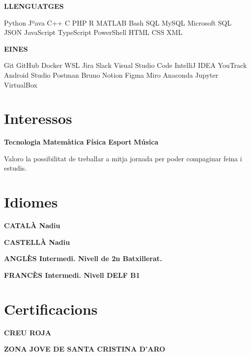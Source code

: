 \documentclass[11pt,a4paper]{article}
\newcommand{\runsubsection}[1]{\color{subheadings}\fontsize{12pt}{12pt}\selectfont\bfseries\uppercase{#1}\normalfont}
\newcommand{\descript}[1]{\color{subheadings}\raggedright\scshape\fontsize{11pt}{13pt}\selectfont{#1 \\}\normalfont}
\newcommand{\location}[1]{\color{headings}\raggedright\fontsize{10pt}{12pt}\selectfont{#1\\}\normalfont}
\newcommand{\sectionsep}{\vspace{8pt}}
\begin{document}
\begin{multicols}{2}
\runsubsection{Llenguatges}

Python \textbullet{} Jºava \textbullet{} C++ \textbullet{} C \textbullet{} PHP \textbullet{} R \textbullet{} MATLAB \textbullet{} Bash \textbullet{} SQL \textbullet{} MySQL \textbullet{} Microsoft SQL \textbullet{} JSON \textbullet{} JavaScript \textbullet{} TypeScript \textbullet{} PowerShell \textbullet{} HTML \textbullet{} CSS \textbullet{} XML
\sectionsep

\runsubsection{Eines}

Git \textbullet{} GitHub \textbullet{} Docker \textbullet{} WSL \textbullet{} Jira \textbullet{} Slack \textbullet{} Visual Studio Code \textbullet{} IntelliJ IDEA \textbullet{} YouTrack \textbullet{} Android Studio \textbullet{} Postman \textbullet{} Bruno \textbullet{} Notion \textbullet{} Figma \textbullet{} Miro \textbullet{} Anaconda \textbullet{} Jupyter \textbullet{} VirtualBox
\sectionsep

\section{Interessos}
\textbf{Tecnologia} \textbullet{} \textbf{Matemàtica} \textbullet{} \textbf{Física} \textbullet{} \textbf{Esport} \textbullet{} \textbf{Música}

Valoro la possibilitat de treballar a mitja jornada per poder compaginar feina i estudis.

\section{Idiomes}

\runsubsection{Català}
Nadiu
\sectionsep

\runsubsection{Castellà}
Nadiu
\sectionsep

\runsubsection{Anglès}
Intermedi. Nivell de 2n Batxillerat.
\sectionsep

\runsubsection{Francès}
Intermedi. Nivell DELF B1
\sectionsep

\section{Certificacions}

\runsubsection{Creu Roja}

\descript{Curs de primers auxilis}
\location{2019 | Santa Cristina d'Aro}
\sectionsep

\runsubsection{Zona Jove de Santa Cristina d'Aro}

\descript{Curs de manipulació d'aliments}
\location{2019 | Santa Cristina d'Aro}
\sectionsep


\end{multicols}
\end{document}
